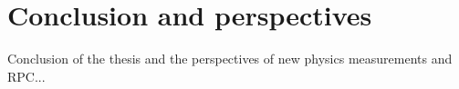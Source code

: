 \chapter{Conclusion and perspectives}\label{chap:conclusion}

Conclusion of the thesis and the perspectives of new physics measurements and RPC...

